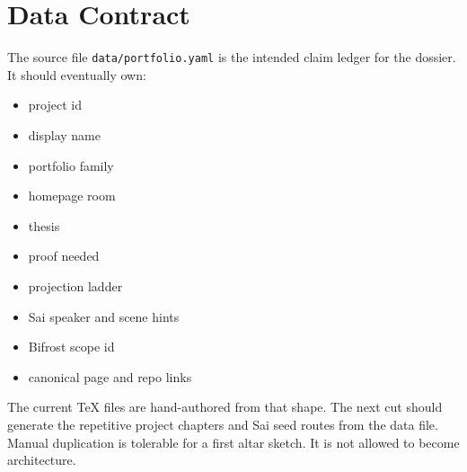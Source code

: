 \chapter{Data Contract}

The source file \texttt{data/portfolio.yaml} is the intended claim ledger for the dossier. It should eventually own:

\begin{itemize}
  \item project id
  \item display name
  \item portfolio family
  \item homepage room
  \item thesis
  \item proof needed
  \item projection ladder
  \item Sai speaker and scene hints
  \item Bifrost scope id
  \item canonical page and repo links
\end{itemize}

The current TeX files are hand-authored from that shape. The next cut should generate the repetitive project chapters and Sai seed routes from the data file. Manual duplication is tolerable for a first altar sketch. It is not allowed to become architecture.
